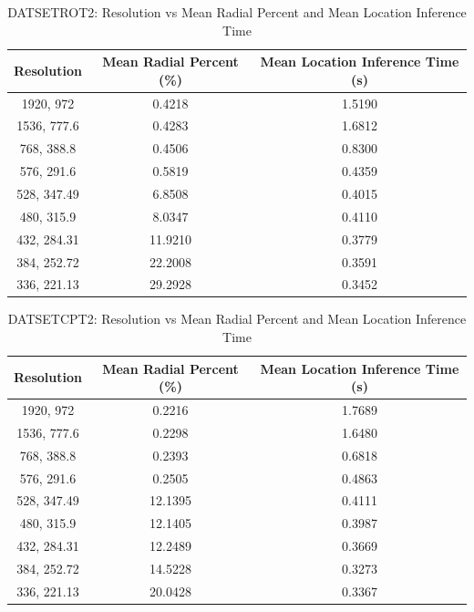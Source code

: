 \begin{table}[H]
\centering
\begin{tabular}{|c|c|c|}
\hline
\textbf{Resolution} & \textbf{Mean Radial Percent (\%)} & \textbf{Mean Location Inference Time (s)} \\
\hline
1920, 972 & 0.4218 & 1.5190 \\
1536, 777.6 & 0.4283 & 1.6812 \\
768, 388.8 & 0.4506 & 0.8300 \\
576, 291.6 & 0.5819 & 0.4359 \\
528, 347.49 & 6.8508 & 0.4015 \\
480, 315.9 & 8.0347 & 0.4110 \\
432, 284.31 & 11.9210 & 0.3779 \\
384, 252.72 & 22.2008 & 0.3591 \\
336, 221.13 & 29.2928 & 0.3452 \\
\hline
\end{tabular}
\caption{DATSETROT2: Resolution vs Mean Radial Percent and Mean Location Inference Time}
\label{tab:datsetrot2}
\end{table}

\begin{table}[H]
\centering
\begin{tabular}{|c|c|c|}
\hline
\textbf{Resolution} & \textbf{Mean Radial Percent (\%)} & \textbf{Mean Location Inference Time (s)} \\
\hline
1920, 972 & 0.2216 & 1.7689 \\
1536, 777.6 & 0.2298 & 1.6480 \\
768, 388.8 & 0.2393 & 0.6818 \\
576, 291.6 & 0.2505 & 0.4863 \\
528, 347.49 & 12.1395 & 0.4111 \\
480, 315.9 & 12.1405 & 0.3987 \\
432, 284.31 & 12.2489 & 0.3669 \\
384, 252.72 & 14.5228 & 0.3273 \\
336, 221.13 & 20.0428 & 0.3367 \\
\hline
\end{tabular}
\caption{DATSETCPT2: Resolution vs Mean Radial Percent and Mean Location Inference Time}
\label{tab:datsetcpt2}
\end{table}

